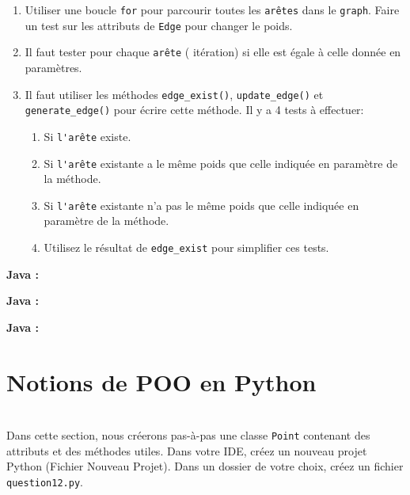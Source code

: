 \begin{Exercice}[20 minutes]
    \begin{conseil}
    \begin{enumerate}
    \item Utiliser une boucle \lstinline{for} pour parcourir toutes les \lstinline{arêtes} dans le \lstinline{graph}. Faire un test sur les attributs de \lstinline{Edge} pour changer le poids.
    \item Il faut tester pour chaque \lstinline{arête} ( itération) si elle  est égale à celle donnée en paramètres.
    \item Il faut utiliser les méthodes \lstinline{edge_exist()}, \lstinline{update_edge()} et \lstinline{generate_edge()} pour écrire cette méthode. Il y a 4 tests à effectuer: 
        \begin{enumerate}
        \item Si \lstinline{l'arête} existe.
        \item Si \lstinline{l'arête} existante a le même poids que celle indiquée en paramètre de la méthode.
        \item Si \lstinline{l'arête} existante n'a pas le même poids que celle indiquée en paramètre de la méthode.
        \item Utilisez le résultat de \lstinline{edge_exist} pour simplifier ces tests.
        \end{enumerate}
    \end{enumerate}
    \end{conseil}
    \begin{solution}
    \textbf{Java :}
         
    \end{solution}
    \begin{solution}
    \textbf{Java :}
         
    \end{solution}
    \begin{solution}
    \textbf{Java :}
         
    \end{solution}

\end{Exercice}

\newpage

\section{Notions de POO en Python}\optionel\\
Dans cette section, nous créerons pas-à-pas une classe \lstinline{Point} contenant des attributs et des méthodes utiles.
Dans votre IDE, créez un nouveau projet Python (Fichier \> Nouveau \> Projet). Dans un dossier de votre choix, créez un fichier \lstinline{question12.py}.

